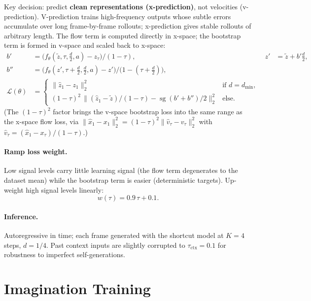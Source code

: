\documentclass[11pt]{article}
\newcommand{\sg}{\operatorname{sg}}
\begin{document}
Key decision: predict \textbf{clean representations (x-prediction)}, not velocities
(v-prediction). V-prediction trains high-frequency outputs whose subtle errors
accumulate over long frame-by-frame rollouts; x-prediction gives stable rollouts of
arbitrary length. The flow term is computed directly in x-space; the bootstrap term is
formed in v-space and scaled back to x-space:
\begin{align}
  b' &= \big(f_\theta(\tilde z,\tau,\tfrac{d}{2},a) - z_\tau\big)\big/(1-\tau),
  & z' &= \tilde z + b'\tfrac{d}{2}, \\
  b'' &= \big(f_\theta(z',\tau+\tfrac{d}{2},\tfrac{d}{2},a) - z'\big)\big/\big(1-(\tau+\tfrac{d}{2})\big), \\
  \mathcal{L}(\theta) &=
  \begin{cases}
    \big\|\hat z_1 - z_1\big\|_2^2 & \text{if } d = d_{\min}, \\[4pt]
    (1-\tau)^2\,\Big\| (\hat z_1 - \tilde z)/(1-\tau) - \sg(b' + b'')/2 \Big\|_2^2 & \text{else.}
  \end{cases}
\end{align}
(The $(1-\tau)^2$ factor brings the v-space bootstrap loss into the same range as the
x-space flow loss, via $\|\hat x_1 - x_1\|_2^2 = (1-\tau)^2\|\hat v_\tau - v_\tau\|_2^2$
with $\hat v_\tau = (\hat x_1 - x_\tau)/(1-\tau)$.)

\paragraph{Ramp loss weight.}
Low signal levels carry little learning signal (the flow term degenerates to the
dataset mean) while the bootstrap term is easier (deterministic targets). Up-weight
high signal levels linearly:
\begin{equation}
  w(\tau) = 0.9\,\tau + 0.1.
\end{equation}

\paragraph{Inference.}
Autoregressive in time; each frame generated with the shortcut model at $K=4$ steps,
$d=1/4$. Past context inputs are slightly corrupted to $\tau_{\text{ctx}} = 0.1$ for
robustness to imperfect self-generations.

\section{Imagination Training}
\end{document}

